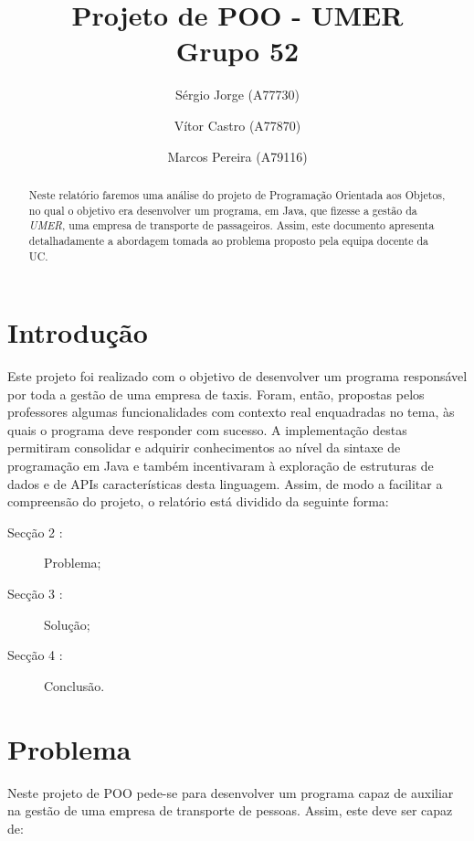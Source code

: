\documentclass[a4paper]{article}
\title{Projeto de POO - UMER\\Grupo 52}
\author{Sérgio Jorge (A77730) \and Vítor Castro (A77870) \and Marcos Pereira (A79116)}
\date{}
\begin{document}
\maketitle

\begin{abstract}
Neste relatório faremos uma análise do projeto de Programação Orientada aos Objetos, no qual o objetivo era desenvolver um programa, em Java, que fizesse a gestão da \textit{UMER},  uma empresa de transporte de passageiros. Assim, este documento apresenta detalhadamente a abordagem tomada ao problema proposto pela equipa docente da UC.
\end{abstract}

\tableofcontents

\section{Introdução}
\label{sec:intro}

Este projeto foi realizado com o objetivo de desenvolver um programa responsável por toda a gestão de uma empresa de taxis. Foram, então, propostas pelos professores algumas funcionalidades com contexto real enquadradas no tema, às quais o programa deve responder com sucesso. A implementação destas permitiram consolidar e adquirir conhecimentos ao nível da sintaxe de programação em Java e também incentivaram à exploração de estruturas de dados e de APIs características desta linguagem.
Assim, de modo a facilitar a compreensão do projeto, o relatório está dividido da seguinte forma:

\begin{description}
    \item[Secção 2 :] Problema;
    \item[Secção 3 :] Solução;
    \item[Secção 4 :] Conclusão.
\end{description}
\pagebreak

\section{Problema}
\label{sec:problema}
Neste projeto de POO pede-se para desenvolver um programa capaz de auxiliar na gestão de uma empresa de transporte de pessoas. Assim, este deve ser capaz de:
\end{document}
